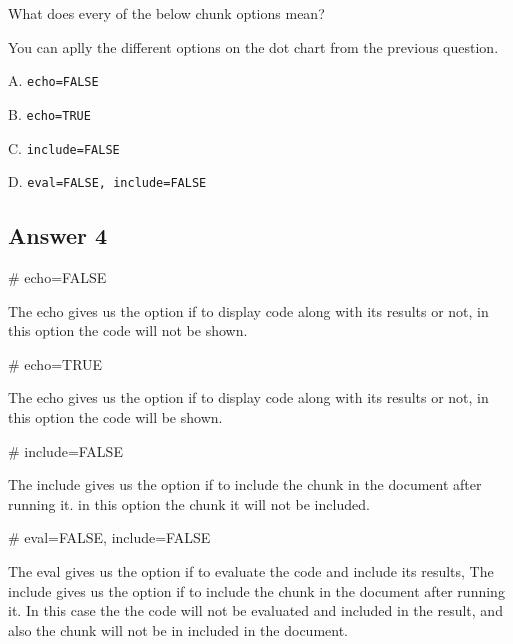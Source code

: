 \documentclass[
  letterpaper,
  DIV=11,
  numbers=noendperiod]{scrartcl}
\newenvironment{Shaded}{\begin{snugshade}}{\end{snugshade}}
\newcommand{\CommentTok}[1]{\textcolor[rgb]{0.37,0.37,0.37}{#1}}
\begin{document}
What does every of the below chunk options mean?

You can aplly the different options on the dot chart from the previous
question.

A. \texttt{echo=FALSE}

B. \texttt{echo=TRUE}

C. \texttt{include=FALSE}

D. \texttt{eval=FALSE,\ include=FALSE}

\hypertarget{answer-4}{%
\subsection{Answer 4}\label{answer-4}}

\begin{Shaded}
\begin{Highlighting}[]
\CommentTok{\# echo=FALSE}
\end{Highlighting}
\end{Shaded}

The echo gives us the option if to display code along with its results
or not, in this option the code will not be shown.

\begin{Shaded}
\begin{Highlighting}[]
\CommentTok{\# echo=TRUE}
\end{Highlighting}
\end{Shaded}

The echo gives us the option if to display code along with its results
or not, in this option the code will be shown.

\begin{Shaded}
\begin{Highlighting}[]
\CommentTok{\# include=FALSE}
\end{Highlighting}
\end{Shaded}

The include gives us the option if to include the chunk in the document
after running it. in this option the chunk it will not be included.

\begin{Shaded}
\begin{Highlighting}[]
\CommentTok{\# eval=FALSE, include=FALSE}
\end{Highlighting}
\end{Shaded}

The eval gives us the option if to evaluate the code and include its
results, The include gives us the option if to include the chunk in the
document after running it. In this case the the code will not be
evaluated and included in the result, and also the chunk will not be in
included in the document.
\end{document}
